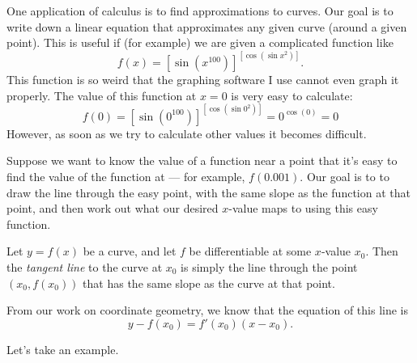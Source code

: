 



One application of calculus is to find approximations to curves. Our goal is to write
down a linear equation that approximates any given curve (around a given point). This is
useful if (for example) we are given a complicated function like
\begin{displaymath}
  f(x) = [\sin(x^{100})]^{[\cos(\sin x^2)]}.
\end{displaymath}
This function is so weird that the graphing software I use cannot even graph it properly. The
value of this function at $ x = 0 $ is very easy to calculate:
\begin{displaymath}
  f(0) = [\sin(0^{100})]^{[\cos(\sin 0^2)]} = 0^{\cos(0)} = 0
\end{displaymath}
However, as soon as we try to calculate other values it becomes difficult.

Suppose we want to know the value of a function near a point that it's easy to find the value of
the function at --- for example, $ f(0.001) $. Our goal is to to draw the line through the easy
point, with the same slope as the function at that point, and then work out what our desired $ x$-value
maps to using this easy function.

\begin{defn}
  Let $ y = f(x) $ be a curve, and let $ f $ be differentiable at some $ x$-value $ x_0 $. Then
  the \emph{tangent line} to the curve at $ x_0 $ is simply the line through the point $ (x_0, f(x_0)) $
  that has the same slope as the curve at that point.

  From our work on coordinate geometry, we know that the equation of this line is
  \begin{displaymath}
    y - f(x_0) = f'(x_0)(x - x_0).
  \end{displaymath}
\end{defn}

Let's take an example.

